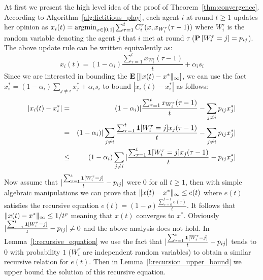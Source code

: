 %
At first we present the high level idea of the proof of Theorem~\ref{thm:convergence}.
According to Algorithm~\ref{alg:fictitious_play}, each agent $i$
at round $t\geq 1$ updates her opinion
as $x_i(t)=\operatorname*{argmin}_{x \in [0,1]}\sum_{\tau=1}^tC^{\tau}_i(x,x_{W_i^{\tau}}(\tau-1))$
where $W_i^\tau$ is the random variable denoting the agent $j$ that $i$ met at round
$\tau$ ($\bm{\mathrm{P}}\left[W_i^\tau=j\right]=p_{ij}$).
The above update rule can be written equivalently as:
\[
  x_i(t)=(1-\alpha_i)\frac{\sum_{\tau=1}^{t} x_{W_i^\tau}(\tau-1)}{t}+ \alpha_i s_i
\]
Since we are interested in bounding the $\bm{\mathrm{E}}_{} \left[ \| x(t)-x^* \|_{\infty} \right]$, we
can use the fact $x_i^*= (1-\alpha_i)\sum_{j \neq i}x_j^* + \alpha_is_i$ to bound $|x_i(t)-x_i^*|$ as follows:
\begin{eqnarray*}
 |x_i(t)-x_i^*|
 &=& (1-\alpha_i)|\frac{\sum_{\tau=1}^{t} x_{W_i^\tau}(\tau-1)}{t}
 - \sum_{j\neq i} p_{ij}x_j^*|\\
 &=& (1-\alpha_i)|\sum_{j\neq i}\frac{\sum_{\tau=1}^{t} \bm{1}{\left[W_i^\tau=j\right]}x_j(\tau-1)}{t}-\sum_{j\neq i} p_{ij}x_j^*|\\
 &\leq& (1-\alpha_i)\sum_{j\neq i}|\frac{\sum_{\tau=1}^{t} \bm{1}{\left[W_i^\tau=j\right]}x_j(\tau-1)}{t}- p_{ij}x_j^*|
\end{eqnarray*}
Now assume that
$|\frac{\sum_{\tau=1}^{t} \bm{1}{\left[W_i^{\tau}=j\right]}}{t}- p_{ij}|$
were $0$ for all $t\geq 1$,
then with simple algebraic manipulations we can prove that $\| x(t)-x^* \|_{\infty} \leq e(t)$
where $e(t)$ satisfies the recursive equation $e(t) = (1-\rho)\frac{\sum_{\tau=0}^{t-1}e(\tau)}{t}$.
It follows that $\| x(t)-x^* \|_{\infty} \leq 1/t^\rho$ meaning that $x(t)$ converges to $x^*$.
Obviously $|\frac{\sum_{\tau=1}^{t} \bm{1}{\left[W_i^{\tau}=j\right]}}{t} - p_{ij}|\neq 0$ and
the above analysis does not hold. In Lemma~\ref{l:recursive_equation} we use the
fact that $|\frac{\sum_{\tau=1}^{t} \bm{1}{\left[W_i^{\tau}=j\right]}}{t} - p_{ij}|$ tends to $0$ with probability $1$
($W_i^{\tau}$ are independent random variables)
to obtain a similar recursive relation for $e(t)$. Then in Lemma~\ref{l:recursion_upper_bound}
we upper bound the solution of this recursive equation.

